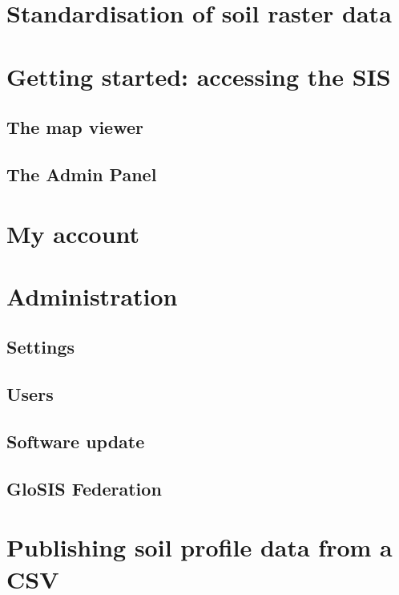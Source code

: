 \documentclass[
  10pt,
  b5paper,
  oneside]{book}
\begin{document}
\section{Standardisation of soil raster data}\label{standardisation-of-soil-raster-data}

\section{Getting started: accessing the SIS}\label{getting-started-accessing-the-sis}

\subsection{The map viewer}\label{the-map-viewer}

\subsection{The Admin Panel}\label{the-admin-panel}

\section{My account}\label{my-account}

\section{Administration}\label{administration}

\subsection{Settings}\label{settings}

\subsection{Users}\label{users}

\subsection{Software update}\label{software-update}

\subsection{GloSIS Federation}\label{glosis-federation}

\section{Publishing soil profile data from a CSV}\label{publishing-soil-profile-data-from-a-csv}
\end{document}
